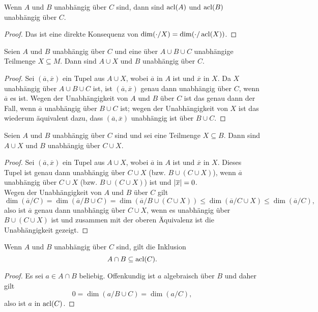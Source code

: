 \begin{lemma}\label{Unabhängigkeit acl}
	Wenn $A$ und $B$ unabhängig über $C$ sind, dann sind $\operatorname{acl}(A)$ und $\operatorname{acl}(B)$ unabhängig über $C$.
\end{lemma}
\begin{proof}
	Das ist eine direkte Konsequenz von $\dim(\cdot/X)=\dim(\cdot/\operatorname{acl}(X))$.
\end{proof}

\begin{lemma}
	Seien $A$ und $B$ unabhängig über $C$ und eine über $A\cup B\cup C$ unabhängige Teilmenge $X\subseteq M$. Dann sind $A\cup X$ und $B$ unabhängig über $C$.
\end{lemma}
\begin{proof}
	Sei $(\overline{a},\overline{x})$ ein Tupel aus $A\cup X$, wobei $\overline{a}$ in $A$ ist und $\overline{x}$ in $X$. Da $X$ unabhängig über $A\cup B\cup C$ ist, ist $(\overline{a},\overline{x})$ genau dann unabhängig über $C$, wenn $\overline{a}$ es ist. Wegen der Unabhängigkeit von $A$ und $B$ über $C$ ist das genau dann der Fall, wenn $\overline{a}$ unabhängig über $B\cup C$ ist; wegen der Unabhängigkeit von $X$ ist das wiederum äquivalent dazu, dass $(\overline{a},\overline{x})$ unabhängig ist über $B\cup C$.
\end{proof}

\begin{lemma}
	Seien $A$ und $B$ unabhängig über $C$ sind und sei eine Teilmenge $X\subseteq B$. Dann sind $A\cup X$ und $B$ unabhängig über $C\cup X$.
\end{lemma}
\begin{proof}
	Sei $(\overline{a},\overline{x})$ ein Tupel aus $A\cup X$, wobei $\overline{a}$ in $A$ ist und $\overline{x}$ in $X$. Dieses Tupel ist genau dann unabhängig über $C\cup X$ (bzw. $B\cup(C\cup X)$), wenn $\overline{a}$ unabhängig über $C\cup X$ (bzw. $B\cup(C\cup X)$) ist und ${\left| \overline{x} \right|}=0$.\\
	Wegen der Unabhängigkeit von $A$ und $B$ über $C$ gilt $$\dim(\overline{a}/C)=\dim(\overline{a}/B\cup C)=\dim(\overline{a}/B\cup(C\cup X))\leq\dim(\overline{a}/C\cup X)\leq\dim(\overline{a}/C),$$ also ist $\overline{a}$ genau dann unabhängig über $C\cup X$, wenn es unabhängig über $B\cup(C\cup X)$ ist und zusammen mit der oberen Äquivalenz ist die Unabhängigkeit gezeigt.
\end{proof}
\newpage
\begin{lemma}
	Wenn $A$ und $B$ unabhängig über $C$ sind, gilt die Inklusion $$A\cap B\subseteq\operatorname{acl}(C).$$
\end{lemma}
\begin{proof}
	Es sei $a\in A\cap B$ beliebig. Offenkundig ist $a$ algebraisch über $B$ und daher gilt $$0=\dim(a/B\cup C)=\dim(a/C),$$ also ist $a$ in $\operatorname{acl}(C)$.
\end{proof}

